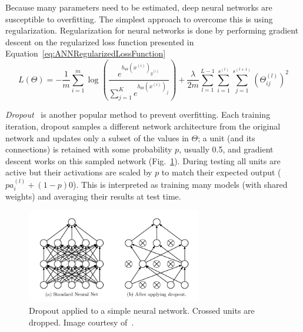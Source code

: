 Because many parameters need to be estimated, deep neural networks are susceptible to overfitting. The simplest approach to overcome this is using regularization. Regularization for neural networks is done by performing gradient descent on the regularized loss function presented in Equation~\ref{eq:ANNRegularizedLossFunction}
\begin{equation}
	L(\Theta) = -\frac{1}{m} \sum_{i=1}^m \log \left ( \frac{ e^{h_\Theta(x^{(i)})_{y^{(i)}}} }{ \sum_{j=1}^K e^{ h_\Theta (x^{(i)})_j} } \right ) + \frac{\lambda}{2m}\sum_{l=1}^{L-1}\sum_{i=1}^{s^{(l)}}\sum_{j=1}^{s^{(l+1)}} \left(\Theta^{(l)}_{ij}\right)^2
	\label{eq:ANNRegularizedLossFunction}
\end{equation}

\emph{Dropout}~\cite{Srivastava2014} is another popular method to prevent overfitting. Each training iteration, dropout samples a different network architecture from the original network and updates only a subset of the values in $\Theta$; a unit (and its connections) is retained with some probability $p$, usually 0.5, and gradient descent works on this sampled network (Fig.~\ref{fig:Dropout}). During testing all units are active but their activations are scaled by $p$ to match their expected output ($p a^{(l)}_i + (1-p) 0$). This is interpreted as training many models (with shared weights) and averaging their results at test time.

\begin{figure}[h]
	\centering
	\includegraphics[width = 0.68\textwidth]{plots/dropout.png}
	\caption[Example of Dropout]{Dropout applied to a simple neural network. Crossed units are dropped. Image courtesy of~\cite{Srivastava2014}.}
	\label{fig:Dropout}
\end{figure}
